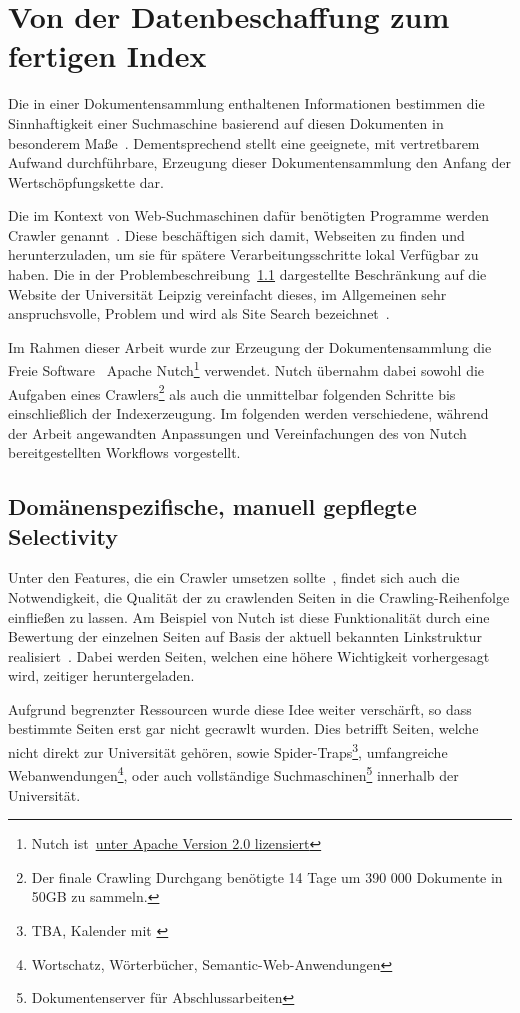\section{Von der Datenbeschaffung zum fertigen Index}
\label{chap:data_aqcuisition}

Die in einer Dokumentensammlung enthaltenen Informationen bestimmen die Sinnhaftigkeit
einer Suchmaschine basierend auf diesen Dokumenten in besonderem Maße~\cite{croft.chap3}.
Dementsprechend stellt eine geeignete, mit vertretbarem Aufwand durchführbare,
Erzeugung dieser Dokumentensammlung den Anfang der Wertschöpfungskette dar.

Die im Kontext von Web-Suchmaschinen dafür benötigten Programme werden Crawler genannt~\cite{croft.chap3}.
Diese beschäftigen sich damit, Webseiten zu finden und herunterzuladen, um sie für spätere Verarbeitungsschritte lokal Verfügbar zu haben.
Die in der Problembeschreibung~\ref{} dargestellte Beschränkung auf die Website der Universität Leipzig
vereinfacht dieses, im Allgemeinen sehr anspruchsvolle, Problem und wird als Site Search bezeichnet~\cite{croft.chap2}.

Im Rahmen dieser Arbeit wurde zur Erzeugung der Dokumentensammlung die Freie Software~\cite{wiki.free_license}
Apache Nutch\footnote{Nutch ist~\href{https://github.com/apache/nutch/blob/master/LICENSE.txt}{unter Apache Version 2.0 lizensiert}}
verwendet.
Nutch übernahm dabei sowohl die Aufgaben eines Crawlers\footnote{Der finale Crawling Durchgang benötigte 14 Tage um 390 000 Dokumente in 50GB zu sammeln.}
als auch die unmittelbar folgenden Schritte bis einschließlich der Indexerzeugung.
Im folgenden werden verschiedene, während der Arbeit angewandten Anpassungen und Vereinfachungen des von Nutch bereitgestellten
Workflows vorgestellt.
 
\subsection{Domänenspezifische, manuell gepflegte Selectivity}
Unter den Features, die ein Crawler umsetzen sollte~\cite{manning.chap20},
findet sich auch die Notwendigkeit, die Qualität der zu crawlenden Seiten
in die Crawling-Reihenfolge einfließen zu lassen.
Am Beispiel von Nutch ist diese Funktionalität durch eine Bewertung der einzelnen Seiten
auf Basis der aktuell bekannten Linkstruktur realisiert~\cite{nutch.invert_links}.
Dabei werden Seiten, welchen eine höhere Wichtigkeit vorhergesagt wird, zeitiger heruntergeladen.

Aufgrund begrenzter Ressourcen wurde diese Idee weiter verschärft,
so dass bestimmte Seiten erst gar nicht gecrawlt wurden.
Dies betrifft Seiten, welche nicht direkt zur Universität gehören,
sowie Spider-Traps\footnote{TBA, Kalender mit \cite{}},
umfangreiche Webanwendungen\footnote{Wortschatz, Wörterbücher, Semantic-Web-Anwendungen},
oder auch vollständige Suchmaschinen\footnote{Dokumentenserver für Abschlussarbeiten} innerhalb der Universität.

